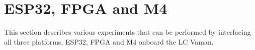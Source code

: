 \section{ESP32, FPGA and M4}
This section describes various experiments that can be performed by interfacing
all three platforms, ESP32, FPGA and M4 onboard the LC Vaman.



